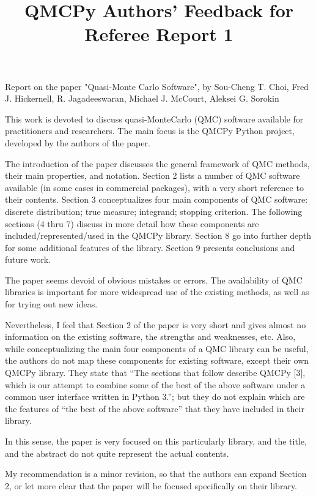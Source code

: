 \documentclass{amsart}
\begin{document}
\title{QMCPy Authors' Feedback for Referee Report 1}


\maketitle

Report on the paper "Quasi-Monte Carlo Software", by Sou-Cheng T. Choi, Fred J. Hickernell, R. Jagadeeswaran, Michael J. McCourt, Aleksei G. Sorokin


This work is devoted to discuss quasi-MonteCarlo (QMC) software available for practitioners and researchers. The main focus is the QMCPy Python project, developed by the authors of the paper.

The introduction of the paper discusses the general framework of QMC methods, their main properties, and notation. Section 2 lists a number of QMC software available (in some cases in commercial packages), with a very short reference to their contents. Section 3 conceptualizes four main components of QMC software: discrete distribution; true measure; integrand; stopping criterion. The following sections (4 thru 7) discuss in more detail how these components are included/represented/used in the QMCPy library. Section 8 go into further depth for some additional features of the library. Section 9 presents conclusions and future work.

The paper seems devoid of obvious mistakes or errors. The  availability of QMC libraries is important for more widespread use of the existing methods, as well as for trying out new ideas.

Nevertheless, I feel that Section 2 of the paper is very short and gives almost no information on the existing software, the strengths and weaknesses, etc.  Also, while conceptualizing the main four components of a QMC library can be useful, the authors do not map these components for existing software, except their own QMCPy library. They state that ``The sections that follow describe QMCPy [3], which is our attempt to combine some of the best of the above software under a common user interface written in Python 3.''; but they do not explain which are the features of ``the best of the above software'' that they have included in their library.

In this sense, the paper is very focused on this particularly library, and the title, and the abstract do not quite represent the actual contents. 

My recommendation is a minor revision, so that the authors can expand Section 2, or let more clear that the paper will be focused specifically on their library.

%
%
\end{document}
